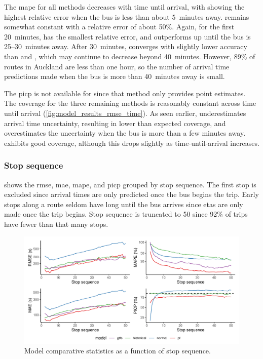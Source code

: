The \gls{mape} for all methods decreases with time until arrival, with \Fhist{} showing the highest relative error when the bus is less than about 5~minutes away. \Fnorm{} remains somewhat constant with a relative error of about 50\%. Again, for the first 20~minutes, \Fpf{} has the smallest relative error, and outperforms \Fsched{} up until the bus is 25--30~minutes away. After 30~minutes, \Fpf{} converges with slightly lower accuracy than \Fhist{} and \Fsched{}, which may continue to decrease beyond 40~minutes. However, 89\% of routes in Auckland are less than one hour, so the number of arrival time predictions made when the bus is more than 40~minutes away is small.


The \gls{picp} is not available for \Fsched{} since that method only provides point estimates. The coverage for the three remaining methods is reasonably constant across time until arrival (\cref{fig:model_results_rmse_time}). As seen earlier, \Fpf{} underestimates arrival time uncertainty, resulting in lower than expected coverage, and \Fnorm{} overestimates the uncertainty when the bus is more than a few minutes away. \Fhist{} exhibits good coverage, although this drops slightly as time-until-arrival increases.


\subsubsection{Stop sequence}

 shows the \gls{rmse}, \gls{mae}, \gls{mape}, and \gls{picp} grouped by stop sequence. The first stop is excluded since arrival times are only predicted once the bus begins the trip. Early stops along a route seldom have long until the bus arrives since \glspl{eta} are only made once the trip begins. Stop sequence is truncated to 50 since  92\% of trips have fewer than that many stops.


\begin{knitrout}\small
{}\color{fgcolor}\begin{figure}
\includegraphics[width=\textwidth]{figure/model_results_rmse_stopn-1} \caption[Model comparative statistics as a function of stop sequence]{Model comparative statistics as a function of stop sequence.}\label{fig:model_results_rmse_stopn}
\end{figure}


\end{knitrout}

